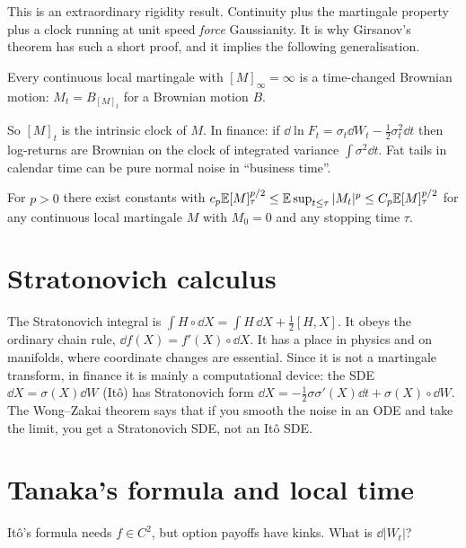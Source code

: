 \begin{intuition}
This is an extraordinary rigidity result. Continuity plus the martingale property plus a clock running at unit speed \emph{force} Gaussianity. It is why Girsanov's theorem has such a short proof, and it implies the following generalisation.
\end{intuition}

\begin{theorem}\label{thm:dds}
Every continuous local martingale with $[M]_\infty=\infty$ is a time-changed Brownian motion: $M_t=B_{[M]_t}$ for a Brownian motion $B$.
\end{theorem}

So $[M]_t$ is the intrinsic clock of $M$. In finance: if $\dd\ln F_t=\sigma_t\dd W_t-\tfrac12\sigma_t^2\dd t$ then log-returns are Brownian on the clock of integrated variance $\int\sigma^2\dd t$. Fat tails in calendar time can be pure normal noise in ``business time''.

\begin{theorem}\label{thm:bdg}
For $p>0$ there exist constants with $c_p\mathbb{E}[M]_\tau^{p/2}\le\mathbb{E}\sup_{t\le\tau}|M_t|^p\le C_p\mathbb{E}[M]_\tau^{p/2}$ for any continuous local martingale $M$ with $M_0=0$ and any stopping time $\tau$.
\end{theorem}

\section{Stratonovich calculus}

The Stratonovich integral is $\int H\circ\dd X=\int H\,\dd X+\tfrac12[H,X]$. It obeys the ordinary chain rule, $\dd f(X)=f'(X)\circ\dd X$. It has a place in physics and on manifolds, where coordinate changes are essential. Since it is not a martingale transform, in finance it is mainly a computational device: the SDE $\dd X=\sigma(X)\dd W$ (It\^o) has Stratonovich form $\dd X=-\tfrac12\sigma\sigma'(X)\dd t+\sigma(X)\circ\dd W$. The Wong--Zakai theorem says that if you smooth the noise in an ODE and take the limit, you get a Stratonovich SDE, not an Itô SDE.

\section{Tanaka's formula and local time}\label{sec:tanaka}

It\^o's formula needs $f\in C^2$, but option payoffs have kinks. What is $\dd|W_t|$?

